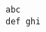 \documentclass{amsart}
\begin{document}
\begin{verbatim}
abc
def ghi      \end{verbatim}
\end{document}
